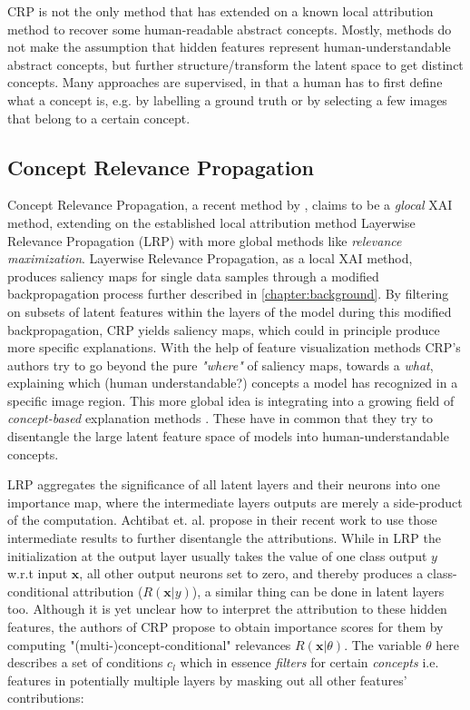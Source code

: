 CRP is not the only method that has extended on a known local attribution method to recover some human-readable abstract concepts.
Mostly, methods do not make the assumption that hidden features represent human-understandable abstract concepts, but further structure/transform the latent space to get distinct concepts.
Many approaches are supervised, in that a human has to first define what a concept is, e.g. by labelling a ground truth or by selecting a few images that belong to a certain concept.

\subsection{Concept Relevance Propagation}\label{section:crp_background}

Concept Relevance Propagation, a recent method by \cite{Achtibat2022}, claims to be a \textit{glocal} XAI method, extending on the established local attribution method Layerwise Relevance Propagation (LRP) \cite{Bach2015} with more global methods like \textit{relevance maximization}. 
Layerwise Relevance Propagation, as a local XAI method, produces saliency maps for single data samples through a modified backpropagation process further described in \autoref{chapter:background}. By filtering on subsets of latent features within the layers of the model during this modified backpropagation, CRP yields saliency maps, which could in principle produce more specific explanations. With the help of feature visualization methods CRP's authors try to go beyond the pure \textit{"where"} of saliency maps, towards a \textit{what}, explaining which (human understandable?) concepts a model has recognized in a specific image region. This more global idea is integrating into a growing field of \textit{concept-based} explanation methods .
These have in common that they try to disentangle the large latent feature space of models into human-understandable concepts.


LRP aggregates the significance of all latent layers and their neurons into one importance map, where the intermediate layers outputs are merely a side-product of the computation.
Achtibat et. al. propose in their recent work \cite{Achtibat2022} to use those intermediate results to further disentangle the attributions. While in LRP the initialization at the output layer usually takes the value of one class output $y$ w.r.t input $\mathbf{x}$, all other output neurons set to zero, and thereby produces a class-conditional attribution ($R(\mathbf{x}|y)$), a similar thing can be done in latent layers too. Although it is yet unclear how to interpret the attribution to these hidden features, the authors of CRP propose to obtain importance scores for them by computing "(multi-)concept-conditional" relevances $R(\mathbf{x}|\theta)$. The variable $\theta$ here describes a set of conditions $c_l$ which in essence \textit{filters} for certain \textit{concepts} i.e. features in potentially multiple layers by masking out all other features' contributions:

